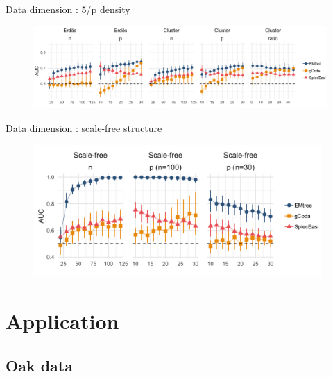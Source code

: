 \documentclass[11pt]{beamer}
\begin{document}
\begin{frame}{Data dimension : 5/p density}
    \begin{figure}
        \centering
        \hspace*{-0.4cm}%
        \includegraphics[width=\paperwidth]{auc5p}
    \end{figure}
\end{frame}
\begin{frame}{Data dimension : scale-free structure}
    \begin{figure}
        \centering
        \hspace*{-0.4cm}%
        \includegraphics[width=11cm]{sfauc}
    \end{figure}
\end{frame}

\section{Application}
\subsection{Oak data}
\end{document}
